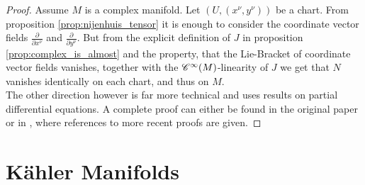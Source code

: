 \begin{proof}
Assume $M$ is a complex manifold. Let $(U,(x^\nu,y^\nu))$ be a chart. From proposition \ref{prop:nijenhuis_tensor} it is enough to consider the coordinate vector fields $\frac{\partial}{\partial x^\nu}$ and $\frac{\partial}{\partial y^\nu}$. But from the explicit definition of $J$  in proposition \ref{prop:complex_is_almost} and the property, that the Lie-Bracket of coordinate vector fields vanishes, together with the $\mathscr{C}^\infty(M)$-linearity of $J$ we get that $N$ vanishes identically on each chart, and thus on $M$.\\
The other direction however is far more technical and uses results on partial differential equations. A complete proof can either be found in the original paper \cite{newlander:coordinates:1957} or in \cite[106]{cannas:symplectic_geometry:2008}, where references to more recent proofs are given.
\end{proof}

\section{K\"ahler Manifolds}

